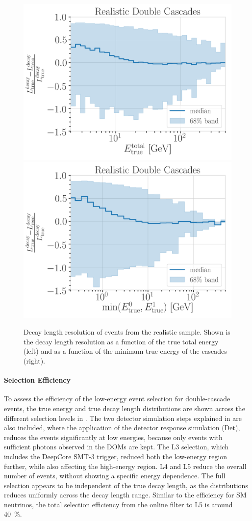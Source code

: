 \begin{figure}[h]
	\centering
    \includegraphics[width=0.49\linewidth]{figures/model_independent_simulation/results/realistic/resolutions/194603_median_decay_length_bias_vs_tot_energy_goodfit_log_unweighted.png}
    \includegraphics[width=0.49\linewidth]{figures/model_independent_simulation/results/realistic/resolutions/194603_median_decay_length_bias_vs_min_energy_goodfit_log_unweighted.png} 
    \caption[Realistic double-cascade decay length resolution versus energies]{Decay length resolution of events from the realistic sample. Shown is the decay length resolution as a function of the true total energy (left) and as a function of the minimum true energy of the cascades (right).}
\end{figure}


\paragraph{Selection Efficiency}

To assess the efficiency of the low-energy event selection for double-cascade events, the true energy and true decay length distributions are shown across the different selection levels in . The two detector simulation steps explained in  are also included, where the application of the detector response simulation (Det), reduces the events significantly at low energies, because only events with sufficient photons observed in the DOMs are kept. The L3 selection, which includes the DeepCore SMT-3 trigger, reduced both the low-energy region further, while also affecting the high-energy region. L4 and L5 reduce the overall number of events, without showing a specific energy dependence. The full selection appears to be independent of the true decay length, as the distributions reduces uniformly across the decay length range. Similar to the efficiency for SM neutrinos, the total selection efficiency from the online filter to L5 is around \SI{40}{\percent}.

